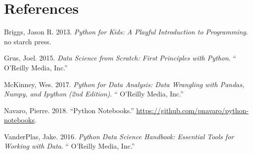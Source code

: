 \documentclass[12pt,]{book}
\numberwithin{equation}{section}
\numberwithin{countremarque}{section}
\begin{document}
\chapter{References}\label{references}

\hypertarget{refs}{}
\hypertarget{ref-briggs_2013_python}{}
Briggs, Jason R. 2013. \emph{Python for Kids: A Playful Introduction to
Programming}. no starch press.

\hypertarget{ref-grus_2015_data}{}
Grus, Joel. 2015. \emph{Data Science from Scratch: First Principles with
Python}. `` O'Reilly Media, Inc.''

\hypertarget{ref-mckinney_2017_python}{}
McKinney, Wes. 2017. \emph{Python for Data Analysis: Data Wrangling with
Pandas, Numpy, and Ipython (2nd Edition)}. `` O'Reilly Media, Inc.''

\hypertarget{ref-navaro_python}{}
Navaro, Pierre. 2018. ``Python Notebooks.''
\url{https://github.com/pnavaro/python-notebooks}.

\hypertarget{ref-vanderplas2016python}{}
VanderPlas, Jake. 2016. \emph{Python Data Science Handbook: Essential
Tools for Working with Data}. `` O'Reilly Media, Inc.''
\end{document}
